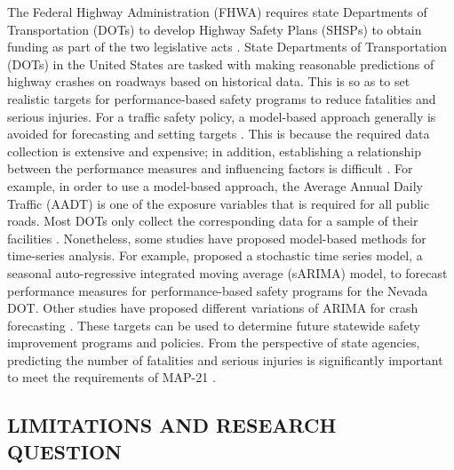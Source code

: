 \documentclass[letterpaper]{article}
\begin{document}
The Federal Highway Administration (FHWA) requires state Departments of Transportation (DOTs) to develop Highway Safety Plans (SHSPs) to obtain funding as part of the two legislative acts \citep{smith2016hsip}. State Departments of Transportation (DOTs) in the United States are tasked with making reasonable predictions of highway crashes on roadways based on historical data. This is so as to set realistic targets for performance-based safety programs to reduce fatalities and serious injuries. For a traffic safety policy, a model-based approach generally is avoided for forecasting and setting targets \citep{veeramisti2016business}. This is because the required data collection is extensive and expensive; in addition, establishing a relationship between the performance measures and influencing factors is difficult \citep{kweon2012appropriate}. For example, in order to use a model-based approach, the Average Annual Daily Traffic (AADT) is one of the exposure variables that is required for all public roads. Most DOTs only collect the corresponding data for a sample of their facilities \citep{veeramisti2016business}. Nonetheless, some studies have proposed model-based methods for time-series analysis. For example, \cite{veeramisti2016business} proposed a stochastic time series model, a seasonal auto-regressive integrated moving average (sARIMA) model, to forecast performance measures for performance-based safety programs for the Nevada DOT. Other studies have proposed different variations of ARIMA for crash forecasting \citep{yannis2011modeling,sukhai2011temporal}. These targets can be used to determine future statewide safety improvement programs and policies. From the perspective of state agencies, predicting the number of fatalities and serious injuries is significantly important to meet the requirements of MAP-21 \citep{smith2016hsip}.

\subsection{LIMITATIONS AND RESEARCH QUESTION}\label{limitations-and-research-questions}
\end{document}
